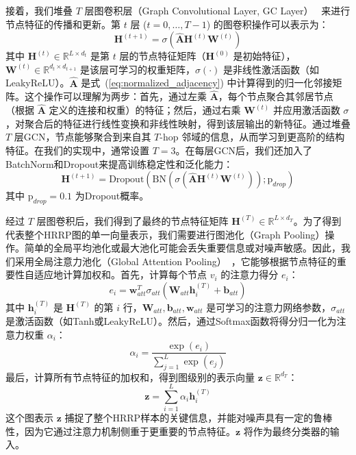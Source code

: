 接着，我们堆叠 $T$ 层图卷积层（Graph Convolutional Layer, GC Layer）~\cite{kipf_semi-supervised_2017} 来进行节点特征的传播和更新。第 $t$ 层 ($t=0, \dots, T-1$) 的图卷积操作可以表示为：
\begin{equation}
    \mathbf{H}^{(t+1)} = \sigma\left(\hat{\mathbf{A}} \mathbf{H}^{(t)} \mathbf{W}^{(t)}\right)
    \label{eq:gcn_layer}
\end{equation}
其中 $\mathbf{H}^{(t)} \in \mathbb{R}^{L \times d_t}$ 是第 $t$ 层的节点特征矩阵（$\mathbf{H}^{(0)}$ 是初始特征），$\mathbf{W}^{(t)} \in \mathbb{R}^{d_t \times d_{t+1}}$ 是该层可学习的权重矩阵，$\sigma(\cdot)$ 是非线性激活函数（如LeakyReLU）。$\hat{\mathbf{A}}$ 是式~(\ref{eq:normalized_adjacency}) 中计算得到的归一化邻接矩阵。这个操作可以理解为两步：首先，通过左乘 $\hat{\mathbf{A}}$，每个节点聚合其邻居节点（根据 $\hat{\mathbf{A}}$ 定义的连接和权重）的特征；然后，通过右乘 $\mathbf{W}^{(t)}$ 并应用激活函数 $\sigma$，对聚合后的特征进行线性变换和非线性映射，得到该层输出的新特征。通过堆叠 $T$ 层GCN，节点能够聚合到来自其 $T$-hop 邻域的信息，从而学习到更高阶的结构特征。在我们的实现中，通常设置 $T=3$。在每层GCN后，我们还加入了BatchNorm和Dropout来提高训练稳定性和泛化能力：
\begin{equation}
    \mathbf{H}^{(t+1)} = \text{Dropout}\left(\text{BN}\left(\sigma\left(\hat{\mathbf{A}} \mathbf{H}^{(t)} \mathbf{W}^{(t)}\right)\right); \text{p}_{drop}\right)
    \label{eq:gcn_layer_full}
\end{equation}
其中 $\text{p}_{drop}=0.1$ 为Dropout概率。

经过 $T$ 层图卷积后，我们得到了最终的节点特征矩阵 $\mathbf{H}^{(T)} \in \mathbb{R}^{L \times d_T}$。为了得到代表整个HRRP图的单一向量表示，我们需要进行图池化（Graph Pooling）操作。简单的全局平均池化或最大池化可能会丢失重要信息或对噪声敏感。因此，我们采用全局注意力池化（Global Attention Pooling）~，它能够根据节点特征的重要性自适应地计算加权和。首先，计算每个节点 $v_i$ 的注意力得分 $e_i$：
\begin{equation}
    e_i = \mathbf{w}_{att}^T \sigma_{att}(\mathbf{W}_{att} \mathbf{h}_i^{(T)} + \mathbf{b}_{att})
    \label{eq:attention_score_node}
\end{equation}
其中 $\mathbf{h}_i^{(T)}$ 是 $\mathbf{H}^{(T)}$ 的第 $i$ 行，$\mathbf{W}_{att}, \mathbf{b}_{att}, \mathbf{w}_{att}$ 是可学习的注意力网络参数，$\sigma_{att}$ 是激活函数（如Tanh或LeakyReLU）。然后，通过Softmax函数将得分归一化为注意力权重 $\alpha_i$：
\begin{equation}
    \alpha_i = \frac{\exp(e_i)}{\sum_{j=1}^L \exp(e_j)}
    \label{eq:attention_weight_node}
\end{equation}
最后，计算所有节点特征的加权和，得到图级别的表示向量 $\mathbf{z} \in \mathbb{R}^{d_T}$：
\begin{equation}
    \mathbf{z} = \sum_{i=1}^L \alpha_i \mathbf{h}_i^{(T)}
    \label{eq:graph_representation}
\end{equation}
这个图表示 $\mathbf{z}$ 捕捉了整个HRRP样本的关键信息，并能对噪声具有一定的鲁棒性，因为它通过注意力机制侧重于更重要的节点特征。$\mathbf{z}$ 将作为最终分类器的输入。

